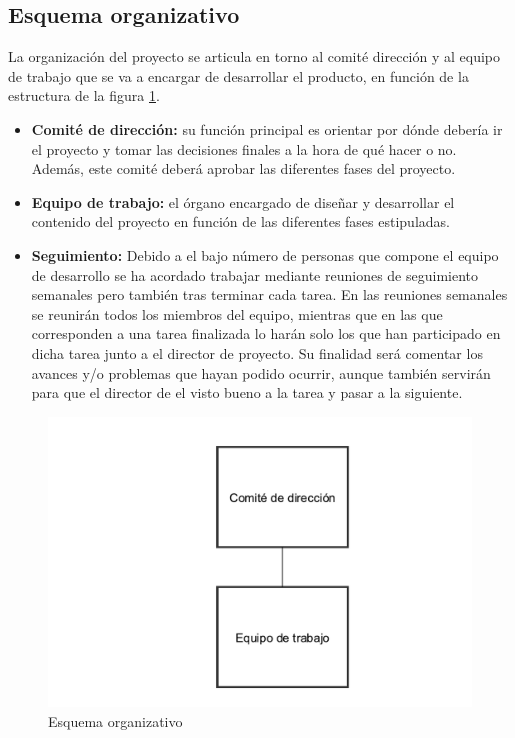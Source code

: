 \subsection{Esquema organizativo}

La organización del proyecto se articula en torno al comité dirección y al equipo de trabajo que se va a encargar de desarrollar el producto, en función de la estructura de la figura \ref{fig:org_schema}.

\begin{itemize}
	\item \textbf{Comité de dirección:} su función principal es orientar por dónde debería ir el proyecto y tomar las decisiones finales a la hora de qué hacer o no. Además, este comité deberá aprobar las diferentes fases del proyecto.
	\item \textbf{Equipo de trabajo:} el órgano encargado de diseñar y desarrollar el contenido del proyecto en función de las diferentes fases estipuladas.
	\item \textbf{Seguimiento:} Debido a el bajo número de personas que compone el equipo de desarrollo se ha acordado trabajar mediante reuniones de seguimiento semanales pero también tras terminar cada tarea. En las reuniones semanales se reunirán todos los miembros del equipo, mientras que en las que corresponden a una tarea finalizada lo harán solo los que han participado en dicha tarea junto a el director de proyecto. Su finalidad será comentar los avances y/o problemas que hayan podido ocurrir, aunque también servirán para que el director de el visto bueno a la tarea y pasar a la siguiente. 
\end{itemize}

\begin{figure}[!htp]
	\centering
	\includegraphics[scale=.75]{fig/organization}
	\caption{Esquema organizativo}\label{fig:org_schema}
\end{figure}